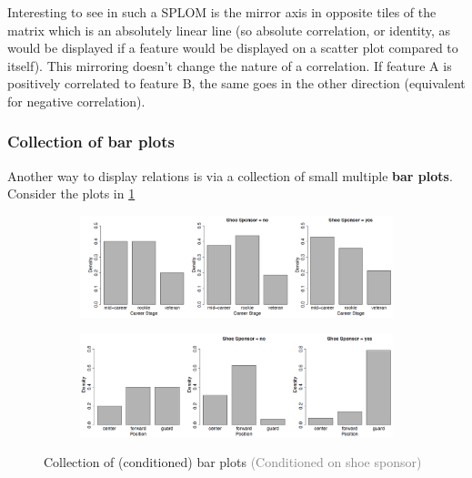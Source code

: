 Interesting to see in such a SPLOM is the mirror axis in opposite tiles of the matrix which is an absolutely linear line (so absolute correlation, or identity, as would be displayed if a feature would be displayed on a scatter plot compared to itself). This mirroring doesn't change the nature of a correlation. If feature A is positively correlated to feature B, the same goes in the other direction (equivalent for negative correlation).

\subsubsection*{Collection of bar plots}

Another way to display relations is via a collection of small multiple \textbf{bar plots}. Consider the plots in \ref{fig:2_barplot}

\begin{figure}[h]
  \centering
  \begin{subfigure}{0.85\textwidth}
    \centering
    \includegraphics[width=\textwidth]{assets/visualization_and_extraction/feature_relation/bar_no.png}
  \end{subfigure}
  
  \vspace*{0.2cm}

  \begin{subfigure}{0.8\textwidth}
    \centering
    \includegraphics[width=\textwidth]{assets/visualization_and_extraction/feature_relation/bar_strong.png}
  \end{subfigure}
  \caption{Collection of (conditioned) bar plots \textcolor{gray}{\footnotesize (Conditioned on shoe sponsor)}}
  \label{fig:2_barplot}
\end{figure}

